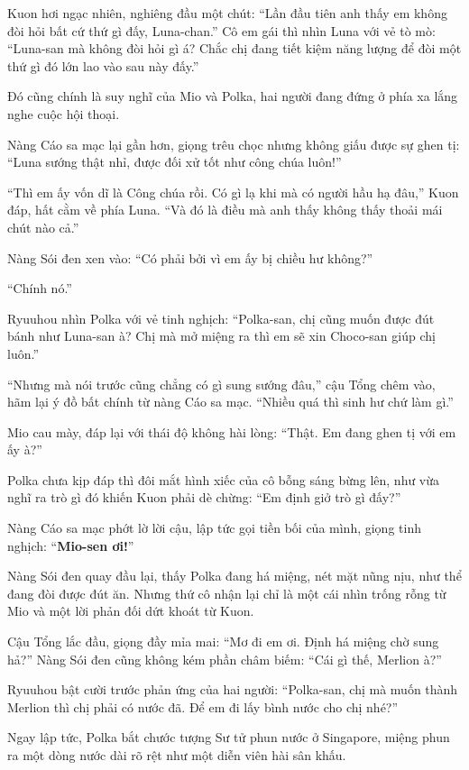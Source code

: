 \documentclass[../main.tex]{subfiles}
\begin{document}
Kuon hơi ngạc nhiên, nghiêng đầu một chút: ``Lần đầu tiên anh thấy em không đòi hỏi bất cứ thứ gì đấy, Luna-chan.'' Cô em gái thì nhìn Luna với vẻ tò mò: ``Luna-san mà không đòi hỏi gì á? Chắc chị đang tiết kiệm năng lượng để đòi một thứ gì đó lớn lao vào sau này đấy.''

Đó cũng chính là suy nghĩ của Mio và Polka, hai người đang đứng ở phía xa lắng nghe cuộc hội thoại.

Nàng Cáo sa mạc lại gần hơn, giọng trêu chọc nhưng không giấu được sự ghen tị: ``Luna sướng thật nhỉ, được đối xử tốt như công chúa luôn!''

``Thì em ấy vốn dĩ là Công chúa rồi. Có gì lạ khi mà có người hầu hạ đâu,'' Kuon đáp, hất cằm về phía Luna. ``Và đó là điều mà anh thấy không thấy thoải mái chút nào cả.''

Nàng Sói đen xen vào: ``Có phải bởi vì em ấy bị chiều hư không?''

``Chính nó.''

Ryuuhou nhìn Polka với vẻ tinh nghịch: ``Polka-san, chị cũng muốn được đút bánh như Luna-san à? Chị mà mở miệng ra thì em sẽ xin Choco-san giúp chị luôn.''

``Nhưng mà nói trước cũng chẳng có gì sung sướng đâu,'' cậu Tổng chêm vào, hãm lại ý đồ bất chính từ nàng Cáo sa mạc. ``Nhiều quá thì sinh hư chứ làm gì.''

Mio cau mày, đáp lại với thái độ không hài lòng: ``Thật. Em đang ghen tị với em ấy à?''

Polka chưa kịp đáp thì đôi mắt hình xiếc của cô bỗng sáng bừng lên, như vừa nghĩ ra trò gì đó khiến Kuon phải dè chừng: ``Em định giở trò gì đấy?''

Nàng Cáo sa mạc phớt lờ lời cậu, lập tức gọi tiền bối của mình, giọng tinh nghịch: ``\textbf{Mio-sen ơi!}''

Nàng Sói đen quay đầu lại, thấy Polka đang há miệng, nét mặt nũng nịu, như thể đang đòi được đút ăn. Nhưng thứ cô nhận lại chỉ là một cái nhìn trống rỗng từ Mio và một lời phản đối dứt khoát từ Kuon.

Cậu Tổng lắc đầu, giọng đầy mỉa mai: ``Mơ đi em ơi. Định há miệng chờ sung hả?'' Nàng Sói đen cũng không kém phần châm biếm: ``Cái gì thế, Merlion à?''

Ryuuhou bật cười trước phản ứng của hai người: ``Polka-san, chị mà muốn thành Merlion thì chị phải có nước đã. Để em đi lấy bình nước cho chị nhé?''

Ngay lập tức, Polka bắt chước tượng Sư tử phun nước ở Singapore, miệng phun ra một dòng nước dài rõ rệt như một diễn viên hài sân khấu.
\end{document}
